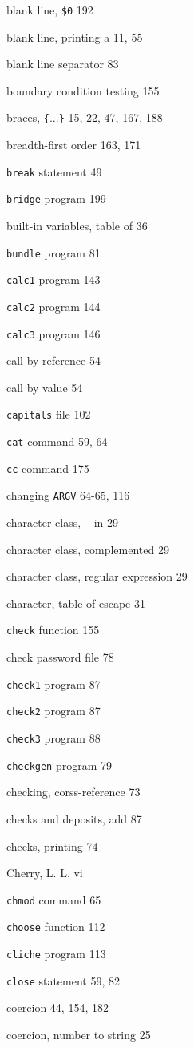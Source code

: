 \begin{multicols}{3}
blank line, \verb'$0' 192 

blank line, printing a 11, 55

blank line separator 83

boundary condition testing 155

braces, \verb'{'...\verb'}' 15, 22, 47, 167, 188

breadth-first order 163, 171

\verb'break' statement 49

\verb'bridge' program 199

built-in variables, table of 36

\verb'bundle' program 81

\verb'calc1' program 143

\verb'calc2' program 144

\verb'calc3' program 146

call by reference 54

call by value 54

\verb'capitals' file 102

\verb'cat' command 59, 64

\verb'cc' command 175

changing \verb'ARGV' 64-65, 116

character class, \verb'-' in 29

character class, complemented 29

character class, regular expression 29

character, table of escape 31

\verb'check' function 155

check password file 78

\verb'check1' program 87

\verb'check2' program 87

\verb'check3' program 88

\verb'checkgen' program 79

checking, corss-reference 73

checks and deposits, add 87

checks, printing 74

Cherry, L. L. vi 

\verb'chmod' command 65

\verb'choose' function 112

\verb'cliche' program 113

\verb'close' statement 59, 82

coercion 44, 154, 182

coercion, number to string 25


\end{multicols}
